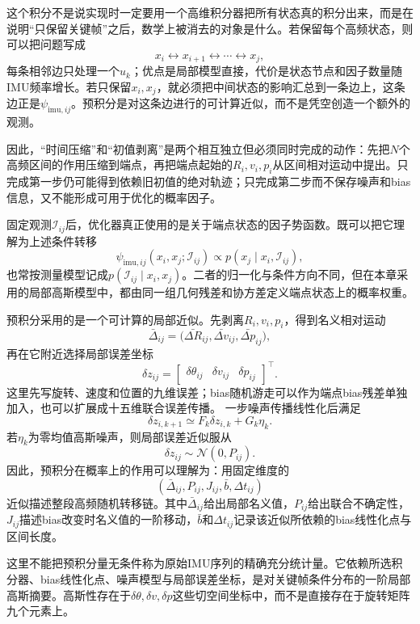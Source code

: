 这个积分不是说实现时一定要用一个高维积分器把所有状态真的积分出来，而是在说明“只保留关键帧”之后，数学上被消去的对象是什么。若保留每个高频状态，则可以把问题写成
\[
    x_i\longleftrightarrow x_{i+1}\longleftrightarrow\cdots
    \longleftrightarrow x_j,
\]
每条相邻边只处理一个$u_k$；优点是局部模型直接，代价是状态节点和因子数量随IMU频率增长。若只保留$x_i,x_j$，就必须把中间状态的影响汇总到一条边上，这条边正是$\psi_{\mathrm{imu},ij}$。预积分是对这条边进行的可计算近似，而不是凭空创造一个额外的观测。

因此，“时间压缩”和“初值剥离”是两个相互独立但必须同时完成的动作：先把$N$个高频区间的作用压缩到端点，再把端点起始的$R_i,v_i,p_i$从区间相对运动中提出。只完成第一步仍可能得到依赖旧初值的绝对轨迹；只完成第二步而不保存噪声和bias信息，又不能形成可用于优化的概率因子。

固定观测$\mathcal I_{ij}$后，优化器真正使用的是关于端点状态的因子势函数。既可以把它理解为上述条件转移
\[
    \psi_{\mathrm{imu},ij}(x_i,x_j;\mathcal I_{ij})
    \propto p(x_j\mid x_i,\mathcal I_{ij}),
\]
也常按测量模型记成$p(\mathcal I_{ij}\mid x_i,x_j)$。二者的归一化与条件方向不同，但在本章采用的局部高斯模型中，都由同一组几何残差和协方差定义端点状态上的概率权重。

预积分采用的是一个可计算的局部近似。先剥离$R_i,v_i,p_i$，得到名义相对运动
\[
    \bar\Delta_{ij}
    =\bigl(
      \bar{\Delta R}_{ij},
      \bar{\Delta v}_{ij},
      \bar{\Delta p}_{ij}
    \bigr),
\]
再在它附近选择局部误差坐标
\[
    \delta z_{ij}
    =\begin{bmatrix}
       \delta\theta_{ij}&\delta v_{ij}&\delta p_{ij}
     \end{bmatrix}^\top.
\]
这里先写旋转、速度和位置的九维误差；bias随机游走可以作为端点bias残差单独加入，也可以扩展成十五维联合误差传播。
一步噪声传播线性化后满足
\[
    \delta z_{i,k+1}
    \simeq F_k\delta z_{i,k}+G_k\eta_k.
\]
若$\eta_k$为零均值高斯噪声，则局部误差近似服从
\[
\boxed{
    \delta z_{ij}\sim\mathcal N(0,P_{ij}).
}
\]
因此，预积分在概率上的作用可以理解为：用固定维度的
\[
\boxed{
    \left(
      \bar\Delta_{ij},
      P_{ij},
      J_{ij},
      \bar b,
      \Delta t_{ij}
    \right)
}
\]
近似描述整段高频随机转移链。其中$\bar\Delta_{ij}$给出局部名义值，$P_{ij}$给出联合不确定性，$J_{ij}$描述bias改变时名义值的一阶移动，$\bar b$和$\Delta t_{ij}$记录该近似所依赖的bias线性化点与区间长度。

这里不能把预积分量无条件称为原始IMU序列的精确充分统计量。它依赖所选积分器、bias线性化点、噪声模型与局部误差坐标，是对关键帧条件分布的一阶局部高斯摘要。高斯性存在于$\delta\theta,\delta v,\delta p$这些切空间坐标中，而不是直接存在于旋转矩阵九个元素上。

